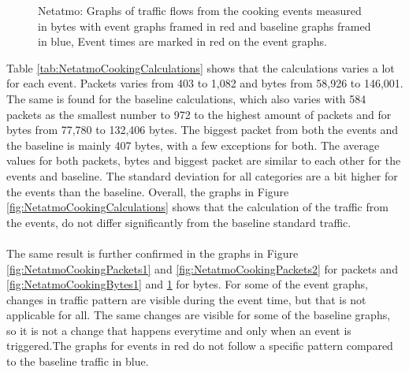 \begin{figure}[H]
\begin{subfigure}[b]{0.47\textwidth}
        \centering
    \end{subfigure}
        \begin{subfigure}[b]{0.47\textwidth}
        \centering
    \end{subfigure}
    \begin{subfigure}[b]{0.47\textwidth}
        \centering
    \end{subfigure}
    \begin{subfigure}[b]{0.47\textwidth}
        \centering
    \end{subfigure}
    \hspace{0.6cm}
    \begin{subfigure}[b]{0.47\textwidth}
    \centering
        \end{subfigure}
    \caption{Netatmo: Graphs of traffic flows from the cooking events measured in bytes with event graphs framed in red and baseline graphs framed in blue, Event times are marked in red on the event graphs.}    \label{fig:NetatmoCookingBytes2}
\end{figure}

Table \ref{tab:NetatmoCookingCalculations} shows that the calculations varies a lot for each event. Packets varies from 403 to 1,082 and bytes from 58,926 to 146,001. The same is found for the baseline calculations, which also varies with 584 packets as the smallest number to 972 to the highest amount of packets and for bytes from 77,780 to 132,406 bytes. The biggest packet from both the events and the baseline is mainly 407 bytes, with a few exceptions for both. The average values for both packets, bytes and biggest packet are similar to each other for the events and baseline. The standard deviation for all categories are a bit higher for the events than the baseline. Overall, the graphs in Figure \ref{fig:NetatmoCookingCalculations} shows that the calculation of the traffic from the events, do not differ significantly from the baseline standard traffic.
\\\\
The same result is further confirmed in the graphs in Figure \ref{fig:NetatmoCookingPackets1} and \ref{fig:NetatmoCookingPackets2} for packets and \ref{fig:NetatmoCookingBytes1} and \ref{fig:NetatmoCookingBytes2} for bytes. For some of the event graphs, changes in traffic pattern are visible during the event time, but that is not applicable for all. The same changes are visible for some of the baseline graphs, so it is not a change that happens everytime and only when an event is triggered.The graphs for events in red do not follow a specific pattern compared to the baseline traffic in blue. 


